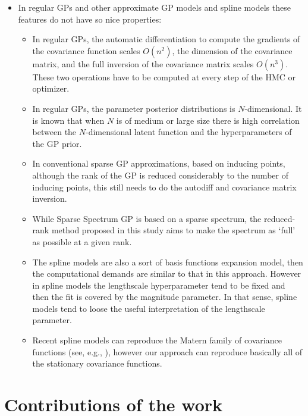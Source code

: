 \documentclass[onecolumn,a4paper,11pt]{article}
\begin{document}
\begin{itemize}
	\item In regular GPs and other approximate GP models and spline models these features do not have so nice properties:
	\begin{itemize}
		\item In regular GPs, the automatic differentiation to compute the gradients of the covariance function scales $O(n^2)$, the dimension of the covariance matrix, and the full inversion of the covariance matrix scales $O(n^3)$. These two operations have to be computed at every step of the HMC or optimizer.

		\item In regular GPs, the parameter posterior distributions is $N$-dimensional. It is known that when $N$ is of medium or large size there is high correlation between the $N$-dimensional latent function and the hyperparameters of the GP prior.

		\item In conventional sparse GP approximations, based on inducing points, although the rank of the GP is reduced considerably to the number of inducing points, this still needs to do the autodiff and covariance matrix inversion.
		
		\item While Sparse Spectrum GP is based on a sparse spectrum, the reduced-rank method proposed in this study aims to make the spectrum as ‘full’ as possible at a given rank.

		\item The spline models are also a sort of basis functions expansion model, then the computational demands are similar to that in this approach. However in spline models the lengthscale hyperparameter tend to be fixed and then the fit is covered by the magnitude parameter. In that sense, spline models tend to loose the useful interpretation of the lengthscale parameter.
		
		\item Recent spline models can reproduce the Matern family of covariance functions (see, e.g., \cite{wood2003thin}), however our approach can reproduce basically all of the stationary covariance functions.
		
	\end{itemize}
\end{itemize}

\section{Contributions of the work}
\end{document}
